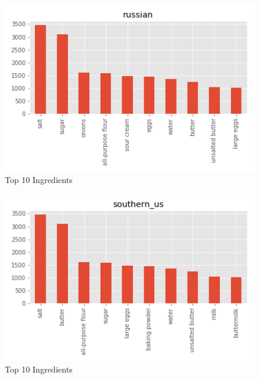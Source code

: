 \documentclass[sigconf]{acmart}
\begin{document}
\begin{figure}[!ht]
  \centering\includegraphics[width=\columnwidth]{images/russian_10_most_used_ingredients.png}
  \caption{Top 10 Ingredients }\label{f:russian_10_most_used_ingredients}
\end{figure}

\begin{figure}[!ht]
  \centering\includegraphics[width=\columnwidth]{images/southern_us_10_most_used_ingredients.png}
  \caption{Top 10 Ingredients }\label{f:southern_us_10_most_used_ingredients}
\end{figure}
\end{document}

